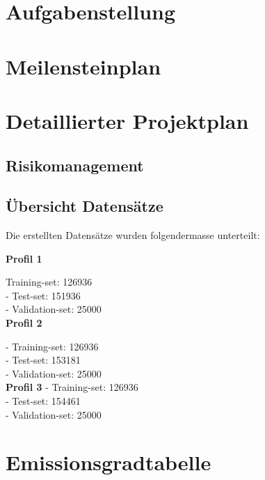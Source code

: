\appendix

\chapter{Aufgabenstellung}
\label{AnhangAufgabenstellung}



\chapter{Meilensteinplan}
\label{AnhangA}

\chapter{Detaillierter Projektplan}
\label{AnhangB}

\section{Risikomanagement}
\label{AnhangC}

\section{Übersicht Datensätze }
\label{AnhangD}

Die erstellten Datensätze wurden folgendermasse unterteilt:


\textbf{Profil 1}

Training-set:         126936 \\
- Test-set:             151936 \\
- Validation-set:       25000 \\


\textbf{Profil 2}

- Training-set:         126936 \\
- Test-set:             153181 \\
- Validation-set:       25000 \\

\textbf{Profil 3}
- Training-set:         126936 \\
- Test-set:             154461 \\ 
- Validation-set:       25000 \\
\newpage

\chapter{Emissionsgradtabelle}
\label{AnhangE}


